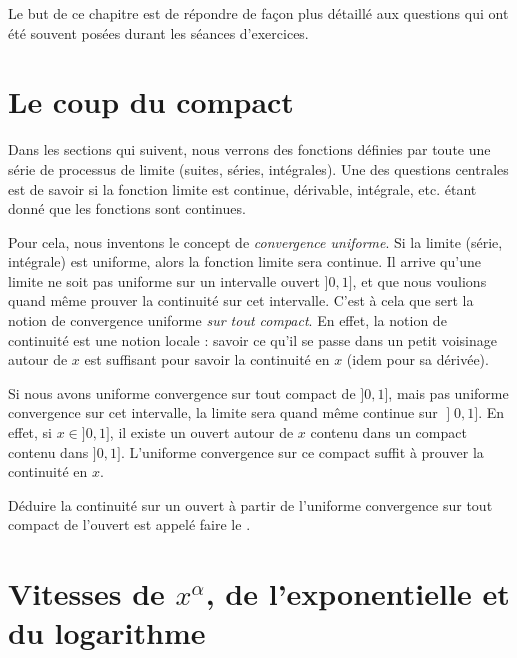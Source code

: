 
Le but de ce chapitre est de répondre de façon plus détaillé aux questions qui ont été souvent posées durant les séances d'exercices.

                    \section{Le coup du compact}

Dans les sections qui suivent, nous verrons des fonctions définies par toute une série de processus de limite (suites, séries, intégrales). Une des questions centrales est de savoir si la fonction limite est continue, dérivable, intégrale, etc. étant donné que les fonctions sont continues.

Pour cela, nous inventons le concept de \emph{convergence uniforme}. Si la limite (série, intégrale) est uniforme, alors la fonction limite sera continue. Il arrive qu'une limite ne soit pas uniforme sur un intervalle ouvert $]0,1]$, et que nous voulions quand même prouver la continuité sur cet intervalle. C'est à cela que sert la notion de convergence uniforme \emph{sur tout compact}. En effet, la notion de continuité est une notion locale : savoir ce qu'il se passe dans un petit voisinage autour de $x$ est suffisant pour savoir la continuité en $x$ (idem pour sa dérivée).

Si nous avons uniforme convergence sur tout compact de $]0,1]$, mais pas uniforme convergence sur cet intervalle, la limite sera quand même continue sur $\mathopen] 0 , 1 \mathclose]$. En effet, si $x\in]0,1]$, il existe un ouvert autour de $x$ contenu dans un compact contenu dans $]0,1]$. L'uniforme convergence sur ce compact suffit à prouver la continuité en $x$.

Déduire la continuité sur un ouvert à partir de l'uniforme convergence sur tout compact de l'ouvert est appelé faire le .

\section{Vitesses de $x^{\alpha}$, de l'exponentielle et du logarithme}

